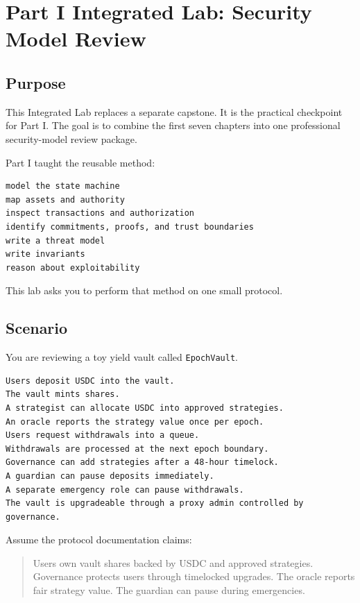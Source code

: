 
\chapter*{Part I Integrated Lab: Security Model Review}

\section*{Purpose}

This Integrated Lab replaces a separate capstone. It is the practical checkpoint for Part I. The goal is to combine the first seven chapters into one professional security-model review package.

Part I taught the reusable method:

\begin{lstlisting}
model the state machine
map assets and authority
inspect transactions and authorization
identify commitments, proofs, and trust boundaries
write a threat model
write invariants
reason about exploitability
\end{lstlisting}

This lab asks you to perform that method on one small protocol.

\section*{Scenario}

You are reviewing a toy yield vault called \passthrough{\lstinline!EpochVault!}.

\begin{lstlisting}
Users deposit USDC into the vault.
The vault mints shares.
A strategist can allocate USDC into approved strategies.
An oracle reports the strategy value once per epoch.
Users request withdrawals into a queue.
Withdrawals are processed at the next epoch boundary.
Governance can add strategies after a 48-hour timelock.
A guardian can pause deposits immediately.
A separate emergency role can pause withdrawals.
The vault is upgradeable through a proxy admin controlled by governance.
\end{lstlisting}

Assume the protocol documentation claims:

\begin{quote}
Users own vault shares backed by USDC and approved strategies. Governance protects users through timelocked upgrades. The oracle reports fair strategy value. The guardian can pause during emergencies.
\end{quote}

